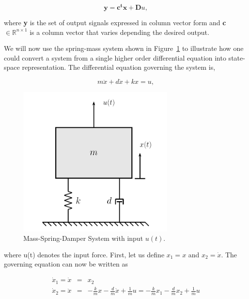 \begin{equation}
\mathbf {y}=\mathbf{c^{t}x}+\mathbf{D}u, \label{eq:output}
\end{equation}

\noindent where \textbf{y} is the set of output signals expressed
in column vector form and \textbf{c} $\in\mathbb{R}^{n\times1}$ is
a column vector that varies depending the desired output.

\medskip We will now use the spring-mass system shown in
Figure~\ref{fig:springMass} to illustrate how one could convert a
system from a single higher order differential equation into
state-space representation.  The differential equation governing
the system is,

\begin{displaymath}
m\ddot {x} +d\dot{x} +kx=u,
\end{displaymath}


\begin{figure}
\centering
\includegraphics[width=0.7\textwidth]{pix/massSpring.jpg} 
\caption{Mass-Spring-Damper System with input $u(t)$.}
\label{fig:springMass}
\end{figure}

\noindent where u(t) denotes the input force.  First, let us
define $x_{1}=x$ and $x_{2}=\dot {x}$.  The governing equation can
now be written as

\begin{eqnarray*}
\dot x_{1}= \dot x&=&x_{2}\\
\dot x_{2}= \ddot x&=&-\frac{k}{m}x-\frac{d}{m}\dot x+\frac{1}{m}u
=-\frac{k}{m}x_{1}-\frac{d}{m}x_{2}+\frac{1}{m}u
\end{eqnarray*}

